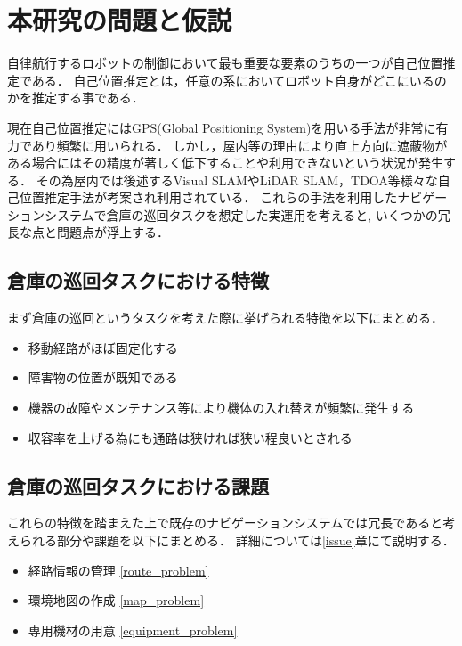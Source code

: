 \section{本研究の問題と仮説}
自律航行するロボットの制御において最も重要な要素のうちの一つが自己位置推定である．
自己位置推定とは，任意の系においてロボット自身がどこにいるのかを推定する事である．

現在自己位置推定にはGPS(Global Positioning System)を用いる手法が非常に有力であり頻繁に用いられる．
しかし，屋内等の理由により直上方向に遮蔽物がある場合にはその精度が著しく低下することや利用できないという状況が発生する．
その為屋内では後述するVisual SLAMやLiDAR SLAM，TDOA等様々な自己位置推定手法が考案され利用されている．
これらの手法を利用したナビゲーションシステムで倉庫の巡回タスクを想定した実運用を考えると,
いくつかの冗長な点と問題点が浮上する．

\subsection{倉庫の巡回タスクにおける特徴}
まず倉庫の巡回というタスクを考えた際に挙げられる特徴を以下にまとめる．
\begin{itemize}
    \item 移動経路がほぼ固定化する
    \item 障害物の位置が既知である
    \item 機器の故障やメンテナンス等により機体の入れ替えが頻繁に発生する
    \item 収容率を上げる為にも通路は狭ければ狭い程良いとされる
\end{itemize}

\subsection{倉庫の巡回タスクにおける課題}
これらの特徴を踏まえた上で既存のナビゲーションシステムでは冗長であると考えられる部分や課題を以下にまとめる．
詳細については\ref{issue}章にて説明する．
\begin{itemize}
    \item 経路情報の管理 \ref{route_problem}
    \item 環境地図の作成 \ref{map_problem}
    \item 専用機材の用意 \ref{equipment_problem}
\end{itemize}